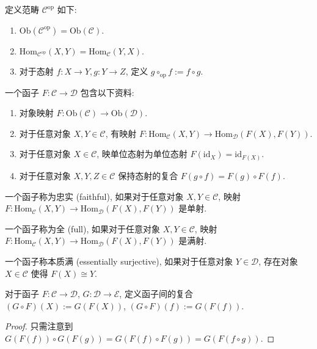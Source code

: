 \begin{definition}[反范畴]
    定义范畴 \(\mathcal{C}^{\mathrm{op}}\) 如下:

    \begin{enumerate}
        \item \(\mathrm{Ob} (\mathcal{C}^{\mathrm{op}}) = \mathrm{Ob} (\mathcal{C})\).
        \item \(\mathrm{Hom}_{\mathcal{C}^{\mathrm{op}}} (X,Y) = \mathrm{Hom}_{\mathcal{C}} (Y,X)\).
        \item 对于态射 \(f : X \to Y, g : Y \to Z\), 定义 \(g \circ_{\mathrm{op}} f := f \circ g\).
    \end{enumerate}
\end{definition}

\begin{definition}[函子]
    \label {definition:functor}
    一个函子 \(F : \mathcal{C} \to \mathcal{D}\) 包含以下资料:

    \begin{enumerate}
        \item 对象映射 \(F : \mathrm{Ob} (\mathcal{C}) \to \mathrm{Ob} (\mathcal{D})\).
        \item 对于任意对象 \(X,Y \in \mathcal{C}\), 有映射 \(F : \mathrm{Hom}_{\mathcal{C}} (X,Y) \to \mathrm{Hom}_{\mathcal{D}} (F(X),F(Y))\).
        \item 对于任意对象 \(X \in \mathcal{C}\), 映单位态射为单位态射 \(F(\mathrm{id}_X) = \mathrm{id}_{F(X)}\).
        \item 对于任意对象 \(X,Y,Z \in \mathcal{C}\) 保持态射的复合 \(F(g \circ f) = F(g) \circ F(f)\).
    \end{enumerate}
\end{definition}

\begin{definition}
    一个函子称为忠实 (faithful), 如果对于任意对象 \(X,Y \in \mathcal{C}\), 映射 \(F : \mathrm{Hom}_{\mathcal{C}} (X,Y) \to \mathrm{Hom}_{\mathcal{D}} (F(X),F(Y))\) 是单射.

    一个函子称为全 (full), 如果对于任意对象 \(X,Y \in \mathcal{C}\), 映射 \(F : \mathrm{Hom}_{\mathcal{C}} (X,Y) \to \mathrm{Hom}_{\mathcal{D}} (F(X),F(Y))\) 是满射.

    一个函子称本质满 (essentially surjective), 如果对于任意对象 \(Y \in \mathcal{D}\), 存在对象 \(X \in \mathcal{C}\) 使得 \(F(X) \cong Y\).
\end{definition}

\begin{definition}
    对于函子 \(F : \mathcal{C} \to \mathcal{D}\), \(G : \mathcal{D} \to \mathcal{E}\), 定义函子间的复合 \((G \circ F) (X) := G(F(X))\), \((G \circ F) (f) := G(F(f))\).

    \begin{proof}
        只需注意到 \(G(F(f)) \circ G(F(g)) = G(F(f) \circ F(g)) = G(F(f \circ g))\).
    \end{proof}
\end{definition}

